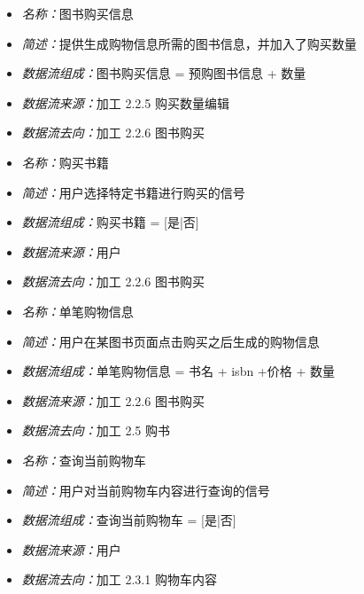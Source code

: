 \vspace{-1mm}

\begin{itemize}
	\item \textit{名称：}图书购买信息
	\item \textit{简述：}提供生成购物信息所需的图书信息，并加入了购买数量
	\item \textit{数据流组成：}图书购买信息  = 预购图书信息 + 数量
	\item \textit{数据流来源：}加工 2.2.5 购买数量编辑
	\item \textit{数据流去向：}加工 2.2.6 图书购买
\end{itemize}

\vspace{-1mm}

\begin{itemize}
	\item \textit{名称：}购买书籍
	\item \textit{简述：}用户选择特定书籍进行购买的信号
	\item \textit{数据流组成：}购买书籍 = [是|否]
	\item \textit{数据流来源：}用户
	\item \textit{数据流去向：}加工 2.2.6 图书购买
\end{itemize}

\vspace{-1mm}

\begin{itemize}
	\item \textit{名称：}单笔购物信息
	\item \textit{简述：}用户在某图书页面点击购买之后生成的购物信息
	\item \textit{数据流组成：}单笔购物信息 = 书名 + isbn +价格 + 数量
	\item \textit{数据流来源：}加工 2.2.6 图书购买
	\item \textit{数据流去向：}加工 2.5 购书
\end{itemize}

\vspace{-1mm}

\begin{itemize}
	\item \textit{名称：}查询当前购物车
	\item \textit{简述：}用户对当前购物车内容进行查询的信号
	\item \textit{数据流组成：}查询当前购物车 = [是|否]
	\item \textit{数据流来源：}用户
	\item \textit{数据流去向：}加工 2.3.1 购物车内容
\end{itemize}

